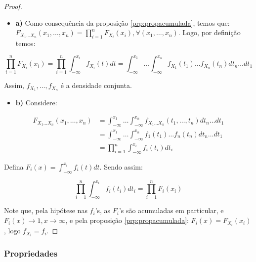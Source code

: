 \documentclass[
]{article}
\providecommand{\tightlist}{%
  \setlength{\itemsep}{0pt}\setlength{\parskip}{0pt}}
\theoremstyle{definition}
\theoremstyle{definition}
\theoremstyle{definition}
\theoremstyle{definition}
\theoremstyle{remark}
\begin{document}
\begin{proof}
\leavevmode

\begin{itemize}
\tightlist
\item
  \textbf{a)} Como consequência da proposição \ref{prp:propacumulada}, temos que: \(F_{X_{1}\ldots X_{n}}(x_{1},\ldots,x_{n}) = \prod_{i=1}^{n}F_{X_{i}}(x_{i}), \forall (x_{1},\ldots,x_{n})\). Logo, por definição temos:
\end{itemize}

\begin{equation*}
\prod_{i=1}^{n}F_{X_{i}}(x_{i}) = \prod_{i=1}^{n}\int_{-\infty}^{x_{i}}f_{X_{i}}(t)dt = \int_{-\infty}^{x_{1}}\dots\int_{-\infty}^{x_{n}}f_{X_{1}}(t_{1})\ldots f_{X_{n}}(t_{n}) dt_{n} \ldots dt_{1}
\end{equation*}

Assim, \(f_{X_{1}},\ldots,f_{X_{n}}\) é a densidade conjunta.

\begin{itemize}
\tightlist
\item
  \textbf{b)} Considere:
\end{itemize}

\begin{align*}
F_{X_{1}\ldots X_{n}}(x_{1},\ldots,x_{n}) &= \int_{-\infty}^{x_{1}} \dots \int_{-\infty}^{x_{n}}f_{X_{1}\ldots X_{n}}(t_{1},\ldots,t_{n})dt_{n}\ldots dt_{1} \\
&= \int_{-\infty}^{x_{1}} \dots \int_{-\infty}^{x_{n}}f_{1}(t_{1}) \ldots f_{n}(t_{n}) dt_{n} \ldots dt_{1} \\
&= \prod_{i=1}^{n}\int_{-\infty}^{x_{i}}f_{i}(t_{i})dt_{i}
\end{align*}

Defina \(F_{i}(x) = \int_{-\infty}^{x_{i}}f_{i}(t)dt\). Sendo assim:

\begin{equation*}
\prod_{i=1}^{n} \int_{-\infty}^{x_{i}}f_{i}(t_{i})dt_{i} = \prod_{i=1}^{n}F_{i}(x_{i})
\end{equation*}

Note que, pela hipótese nas \(f_{i}\)'s, as \(F_{i}\)'s são acumuladas em particular, e \(F_{i}(x) \to 1, x \to \infty\), e pela proposição \ref{prp:propacumulada}: \(F_{i}(x) = F_{X_{i}}(x_{i})\), logo \(f_{X_{i}} = f_{i}\).

\end{proof}

\hypertarget{propriedades}{%
\subsubsection{Propriedades}\label{propriedades}}
\end{document}
